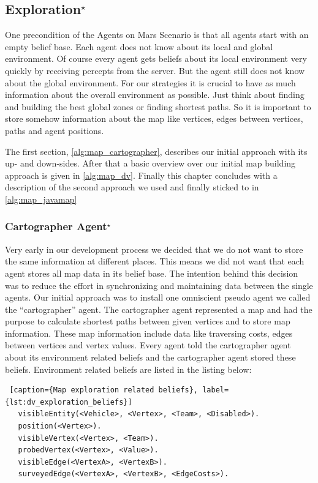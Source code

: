 \subsection[Exploration]{Exploration$^\star$}\label{alg:exploration}
One precondition of the Agents on Mars Scenario is that all agents start with an empty belief base. Each agent does not know about its local and global environment. Of course every agent gets beliefs about its local environment very quickly by receiving percepts from the server. But the agent still does not know about the global environment. For our strategies it is crucial to have as much information about the overall environment as possible. Just think about finding and building the best global zones or finding shortest paths. So it is important to store somehow information about the map like vertices, edges between vertices, paths and agent positions. 

The first section, \autoref{alg:map_cartographer}, describes our initial approach with its up- and down-sides. After that a basic overview over our initial map building approach is given in \autoref{alg:map_dv}. Finally this chapter concludes with a description of the second approach we used and finally sticked to in \autoref{alg:map_javamap}


\subsubsection[Cartographer Agent]{Cartographer Agent$^\star$}\label{alg:map_cartographer}
Very early in our development process we decided that we do not want to store the same information at different places. This means we did not want that each agent stores all map data in its belief base. The intention behind this decision was to reduce the effort in synchronizing and maintaining data between the single agents. Our initial approach was to install one omniscient pseudo agent we called the ``cartographer'' agent. The cartographer agent represented a map and had the purpose to calculate shortest paths between given vertices and to store map information. These map information include data like traversing costs, edges between vertices and vertex values. Every agent told the cartographer agent about its environment related beliefs and the cartographer agent stored these beliefs. Environment related beliefs are listed in the listing below:

\begin{lstlisting} [caption={Map exploration related beliefs}, label={lst:dv_exploration_beliefs}]
   visibleEntity(<Vehicle>, <Vertex>, <Team>, <Disabled>).
   position(<Vertex>).
   visibleVertex(<Vertex>, <Team>).
   probedVertex(<Vertex>, <Value>).
   visibleEdge(<VertexA>, <VertexB>).
   surveyedEdge(<VertexA>, <VertexB>, <EdgeCosts>).
\end{lstlisting}

